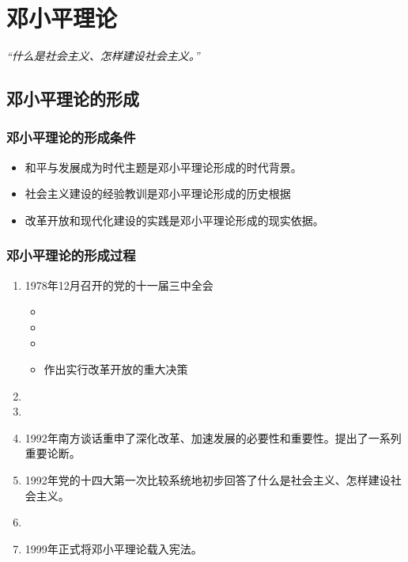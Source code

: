\chapter{邓小平理论}
\emph{“什么是社会主义、怎样建设社会主义。”}

\section{邓小平理论的形成}
    \subsection{邓小平理论的形成条件}
        \begin{itemize}
            \item 和平与发展成为时代主题是邓小平理论形成的时代背景。
            \item 社会主义建设的经验教训是邓小平理论形成的历史根据
            \item 改革开放和现代化建设的实践是邓小平理论形成的现实依据。
        \end{itemize}

    \subsection{邓小平理论的形成过程}
        \begin{enumerate}
            \item 1978年12月召开的党的十一届三中全会
            \begin{itemize}
                \item {}
                \item {}
                \item {}
                \item 作出实行改革开放的重大决策
            \end{itemize}
            \item {}
            \item {}
            \item 1992年南方谈话重申了深化改革、加速发展的必要性和重要性。提出了一系列重要论断。
            \item 1992年党的十四大第一次比较系统地初步回答了什么是社会主义、怎样建设社会主义。
            \item {}
            \item 1999年正式将邓小平理论载入宪法。
        \end{enumerate}


